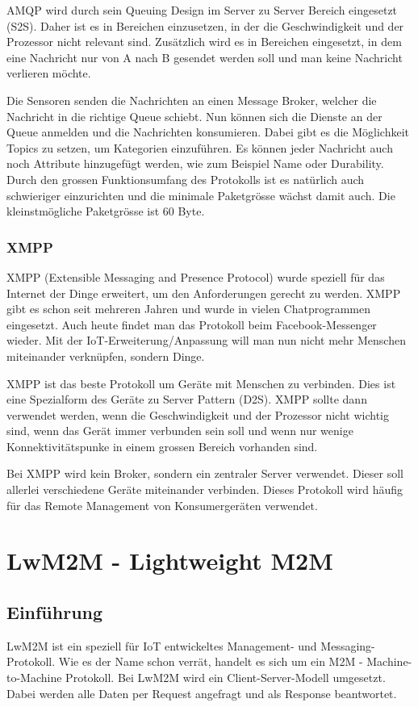 AMQP wird durch sein Queuing Design im Server zu Server Bereich eingesetzt (S2S).\cite{ProtPubSub} Daher ist es in Bereichen einzusetzen, in der die Geschwindigkeit und der Prozessor nicht relevant sind. Zusätzlich wird es in Bereichen eingesetzt, in dem eine Nachricht nur von A nach B gesendet werden soll und man keine Nachricht verlieren möchte.

Die Sensoren senden die Nachrichten an einen Message Broker, welcher die Nachricht in die richtige Queue schiebt. Nun können sich die Dienste an der Queue anmelden und die Nachrichten konsumieren. Dabei gibt es die Möglichkeit Topics zu setzen, um Kategorien einzuführen. Es können jeder Nachricht auch noch Attribute hinzugefügt werden, wie zum Beispiel Name oder Durability. Durch den grossen Funktionsumfang des Protokolls ist es natürlich auch schwieriger einzurichten und die minimale Paketgrösse wächst damit auch. Die kleinstmögliche Paketgrösse ist 60 Byte.
\subsubsection{XMPP}
XMPP (Extensible Messaging and Presence Protocol) wurde speziell für das Internet der Dinge erweitert, um den Anforderungen gerecht zu werden. XMPP gibt es schon seit mehreren Jahren und wurde in vielen Chatprogrammen eingesetzt. Auch heute findet man das Protokoll beim Facebook-Messenger wieder. Mit der IoT-Erweiterung/Anpassung will man nun nicht mehr Menschen miteinander verknüpfen, sondern Dinge. 

XMPP ist das beste Protokoll um Geräte mit Menschen zu verbinden. Dies ist eine Spezialform des Geräte zu Server Pattern (D2S). \cite{ProtPubSub} XMPP sollte dann verwendet werden, wenn die Geschwindigkeit und der Prozessor nicht wichtig sind, wenn das Gerät immer verbunden sein soll und wenn nur wenige Konnektivitätspunke in einem grossen Bereich vorhanden sind.\cite{ProtPubSubReason}

Bei XMPP wird kein Broker, sondern ein zentraler Server verwendet. Dieser soll allerlei verschiedene Geräte miteinander verbinden. Dieses Protokoll wird häufig für das Remote Management von Konsumergeräten verwendet.

\newpage

\section{LwM2M - Lightweight M2M}
\label{sec:lwm2m}
\subsection{Einführung}
LwM2M ist ein speziell für IoT entwickeltes Management- und Messaging-Protokoll. Wie es der Name schon verrät, handelt es sich um ein M2M - Machine-to-Machine Protokoll. Bei LwM2M wird ein Client-Server-Modell umgesetzt. Dabei werden alle Daten per Request angefragt und als Response beantwortet.

